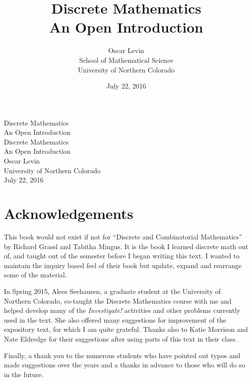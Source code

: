 \documentclass[10pt,]{book}
\title{Discrete Mathematics\\
{\large An Open Introduction}}
\author{Oscar Levin\\
School of Mathematical Science\\
University of Northern Colorado
}
\date{July 22, 2016}
\theoremstyle{plain}
\theoremstyle{definition}
\theoremstyle{definition}
\theoremstyle{definition}
\numberwithin{equation}{section}
\begin{document}
\frontmatter
\thispagestyle{empty}
{\centering
\vspace*{0.28\textheight}
{\Huge Discrete Mathematics}\\[2\baselineskip]
{\LARGE An Open Introduction}\\
}
\clearpage
\thispagestyle{empty}
\null%
\clearpage
\thispagestyle{empty}
{\centering
\vspace*{0.14\textheight}
{\Huge Discrete Mathematics}\\[\baselineskip]
{\LARGE An Open Introduction}\\[3\baselineskip]
{\Large Oscar Levin}\\[0.5\baselineskip]
{\Large University of Northern Colorado}\\[3\baselineskip]
{\Large July 22, 2016}\\}
\clearpage
\thispagestyle{empty}
\null\clearpage
\chapter*{Acknowledgements}\label{acknowledgement-1}

  This book would not exist if not for ``Discrete and Combinatorial Mathematics'' by Richard Grassl and Tabitha Mingus. It is the book I learned discrete math out of, and taught out of the semester before I began writing this text. I wanted to maintain the inquiry based feel of their book but update, expand and rearrange some of the material.
\par

  In Spring 2015, Alees Seehausen, a graduate student at the University of Northern Colorado, co-taught the Discrete Mathematics course with me and helped develop many of the \emph{Investigate!} activities and other problems currently used in the text. She also offered many suggestions for improvement of the expository text, for which I am quite grateful. Thanks also to Katie Morrison and Nate Eldredge for their suggestions after using parts of this text in their class.
\par

  Finally, a thank you to the numerous students who have pointed out typos and made suggestions over the years and a thanks in advance to those who will do so in the future.
\end{document}
